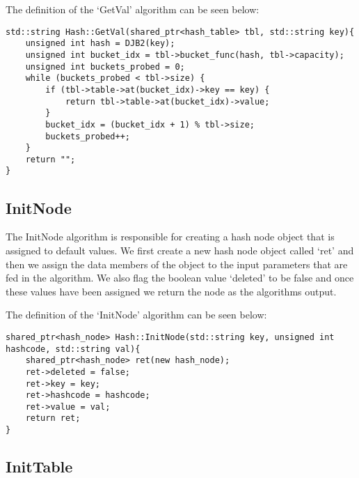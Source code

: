 \begin{highlight}

The definition of the `GetVal' algorithm can be seen below:

\horizontalline

\begin{verbatim}
std::string Hash::GetVal(shared_ptr<hash_table> tbl, std::string key){
    unsigned int hash = DJB2(key);
    unsigned int bucket_idx = tbl->bucket_func(hash, tbl->capacity);
    unsigned int buckets_probed = 0;
    while (buckets_probed < tbl->size) {
        if (tbl->table->at(bucket_idx)->key == key) {
            return tbl->table->at(bucket_idx)->value;
        }
        bucket_idx = (bucket_idx + 1) % tbl->size;
        buckets_probed++;
    }
    return "";
}
\end{verbatim}

\end{highlight}

\subsection*{InitNode}

The InitNode algorithm is responsible for creating a hash node object that is assigned to default values. We first create a new hash node object called `ret' and then we assign the data members of
the object to the input parameters that are fed in the algorithm. We also flag the boolean value `deleted' to be false and once these values have been assigned we return the node as the algorithms
output.

\begin{highlight}

The definition of the `InitNode' algorithm can be seen below:

\horizontalline

\begin{verbatim}
shared_ptr<hash_node> Hash::InitNode(std::string key, unsigned int hashcode, std::string val){
    shared_ptr<hash_node> ret(new hash_node);
    ret->deleted = false;
    ret->key = key;
    ret->hashcode = hashcode;
    ret->value = val;
    return ret;
}
\end{verbatim}

\end{highlight}

\subsection*{InitTable}

